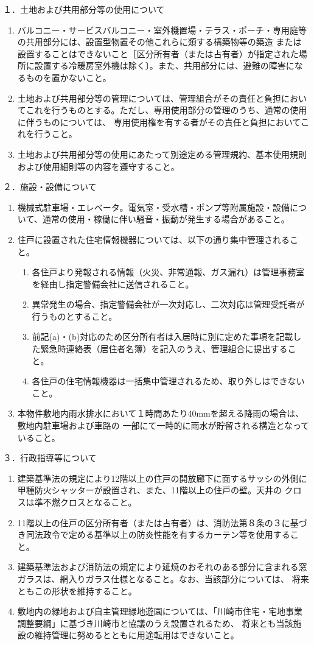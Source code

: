 \documentclass[
  luatex,
  paper=a4paper,
  fontsize=11pt,
  jafontsize=11pt,
  jlreq_notes,
]{jlreq}
\begin{document}
  \noindent
  １．土地および共用部分等の使用について
  \begin{enumerate}
    \item バルコニー・サービスバルコニー・室外機置場・テラス・ポーチ・専用庭等の共用部分には、設置型物置その他これらに類する構築物等の築造
    または設置することはできないこと［区分所有者（または占有者）が指定された場所に設置する冷暖房室外機は除く〕。また、共用部分には、避難の障害になるものを置かないこと。
    \item 土地および共用部分等の管理については、管理組合がその責任と負担においてこれを行うものとする。ただし、専用使用部分の管理のうち、通常の使用に伴うものについては、
          専用使用権を有する者がその責任と負担においてこれを行うこと。
    \item 土地および共用部分等の使用にあたって別途定める管理規約、基本使用規則および使用細則等の内容を遵守すること。
  \end{enumerate}
  ２．施設・設備について
  \begin{enumerate}
  \item 機械式駐車場・エレベータ。電気室・受水槽・ポンプ等附属施設・設備について、通常の使用・稼働に伴い騒音・振動が発生する場合があること。
  \item 住戸に設置された住宅情報機器については、以下の通り集中管理されること。
  \begin{enumerate}
    \item 各住戸より発報される情報（火災、非常通報、ガス漏れ）は管理事務室を経由し指定警備会社に送信されること。
    \item 異常発生の場合、指定警備会社が一次対応し、二次対応は管理受託者が行うものとすること。
    \item 前記(a)・(b)対応のため区分所有者は入居時に別に定めた事項を記載した緊急時連絡表（居住者名簿）を記入のうえ、管理組合に提出すること。
    \item 各住戸の住宅情報機器は一括集中管理されるため、取り外しはできないこと。
  \end{enumerate}
  \item 本物件敷地内雨水排水において１時間あたり40mmを超える降雨の場合は、敷地内駐車場および車路の
        一部にて一時的に雨水が貯留される構造となっていること。
  \end{enumerate}
  ３．行政指導等について
  \begin{enumerate}
  \item 建築基準法の規定により12階以上の住戸の開放廊下に面するサッシの外側に甲種防火シャッターが設置され、また、11階以上の住戸の壁。天井の クロスは準不燃クロスとなること。
  \item 11階以上の住戸の区分所有者（または占有者）は、消防法第８条の３に基づき同法政令で定める基準以上の防炎性能を有するカーテン等を使用すること。
  \item 建築基準法および消防法の規定により延焼のおそれのある部分に含まれる窓ガラスは、網入りガラス仕様となること。なお、当該部分については、
        将来ともこの形状を維持すること。
  \item 敷地内の緑地および自主管理緑地遊園については、「川崎市住宅・宅地事業調整要綱」に基づき川崎市と協議のうえ設置されるため、
        将来とも当該施設の維持管理に努めるとともに用途転用はできないこと。
  \end{enumerate}
\end{document}
